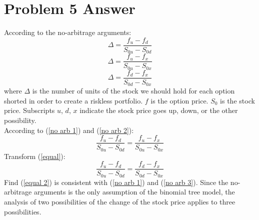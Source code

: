 \documentclass{article}
\begin{document}
    \section*{Problem 5 Answer}
    According to the no-arbitrage arguments:
    \begin{equation}
        \label{no arb 1}
        \Delta = \frac{f_{u}-f_{d}}{S_{0u}-S_{0d}}
    \end{equation}
    \begin{equation}
        \label{no arb 2}
        \Delta = \frac{f_{u}-f_{x}}{S_{0u}-S_{0x}}
    \end{equation}
    \begin{equation}
        \label{no arb 3}
        \Delta = \frac{f_{d}-f_{x}}{S_{0d}-S_{0x}}
    \end{equation}
    where $\Delta$ is the number of units of the stock we should hold for each option shorted in order to create a riskless portfolio. $f$ is the option price. $S_0$ is the stock price. Subscripts $u$, $d$, $x$ indicate the stock price goes up, down, or the other possibility. \\
    According to (\ref{no arb 1}) and (\ref{no arb 2}):
    \begin{equation}
        \label{equal}
        \frac{f_{u}-f_{d}}{S_{0u}-S_{0d}} = \frac{f_{u}-f_{x}}{S_{0u}-S_{0x}}
    \end{equation}
    Transform (\ref{equal}):
    \begin{equation}
        \label{equal 2}
        \frac{f_{u}-f_{d}}{S_{0u}-S_{0d}} = \frac{f_{d}-f_{x}}{S_{0d}-S_{0x}}
    \end{equation}
    Find (\ref{equal 2}) is consistent with (\ref{no arb 1}) and (\ref{no arb 3}).
    Since the no-arbitrage arguments is the only assumption of the binomial tree model, the analysis of two possibilities of the change of the stock price applies to three possibilities.
    
\end{document}
